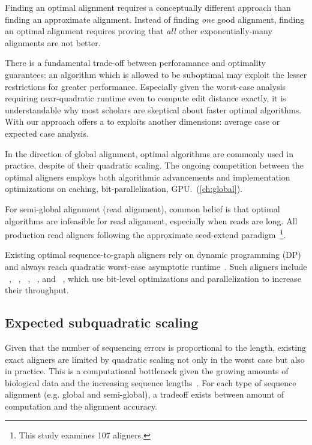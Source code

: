 Finding an optimal alignment requires a conceptually different approach than
finding an approximate alignment. Instead of finding \emph{one} good alignment,
finding an optimal alignment requires proving that \emph{all} other
exponentially-many alignments are not better.

There is a fundamental trade-off between perforamance and optimality guarantees:
an algorithm which is allowed to be suboptimal may exploit the lesser
restrictions for greater performance. Especially given the worst-case analysis
requiring near-quadratic runtime even to compute edit distance exactly, it is
understandable why most scholars are skeptical about faster optimal algorithms.
With our \A approach offers a to exploits another dimensions: average case or
expected case analysis.

In the direction of global alignment, optimal algorithms are commonly used in
practice, despite of their quadratic scaling. The ongoing competition between
the optimal aligners employs both algorithmic advancements and implementation
optimizations on caching, bit-parallelization, GPU.~(\cref{ch:global}).

For semi-global alignment (read alignment), common belief is that optimal
algorithms are infeasible for read alignment, especially when reads are long.
All production read aligners following the approximate seed-extend
paradigm~\cite{alser2021technology}\footnote{This study examines 107 aligners.}.

Existing optimal sequence-to-graph aligners rely on dynamic programming (DP) and
always reach quadratic worst-case asymptotic runtime~\citep{equi2019complexity}.
Such aligners include \vargas~\citep{darby2020vargas},
\pasgal~\citep{jain_accelerating_2019},
\graphaligner~\citep{rautiainen_bitparallel_2019},
\hga~\citep{feng2021accelerating}, and \vg~\citep{garrison_variation_2018},
which use bit-level optimizations and parallelization to increase their
throughput.

\subsection*{Expected subquadratic scaling}

Given that the number of sequencing errors is proportional to the length,
existing exact aligners are limited by quadratic scaling not only in the worst
case but also in practice. This is a computational bottleneck given the growing
amounts of biological data and the increasing sequence
lengths~\citep{kucherov2019evolution}. For each type of sequence alignment (e.g.
global and semi-global), a tradeoff exists between amount of computation and the
alignment accuracy.

